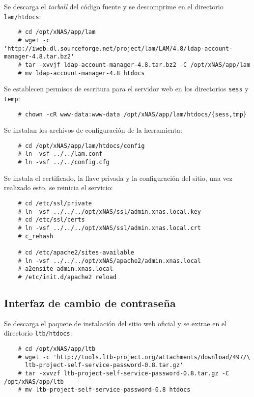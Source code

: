 Se descarga el \textit{tarball} del c\'{o}digo fuente y se descomprime en el directorio \texttt{lam/htdocs}:

{
\scriptsize
\linespread{1}
\begin{verbatim}
    # cd /opt/xNAS/app/lam
    # wget -c 'http://iweb.dl.sourceforge.net/project/lam/LAM/4.8/ldap-account-manager-4.8.tar.bz2'
    # tar -xvvjf ldap-account-manager-4.8.tar.bz2 -C /opt/xNAS/app/lam
    # mv ldap-account-manager-4.8 htdocs
\end{verbatim}
}

Se establecen permisos de escritura para el servidor web en los directorios \texttt{sess} y \texttt{temp}:

{
\scriptsize
\linespread{1}
\begin{verbatim}
    # chown -cR www-data:www-data /opt/xNAS/app/lam/htdocs/{sess,tmp}
\end{verbatim}
}

Se instalan los archivos de configuraci\'{o}n de la herramienta:

{
\scriptsize
\linespread{1}
\begin{verbatim}
    # cd /opt/xNAS/app/lam/htdocs/config
    # ln -vsf ../../lam.conf
    # ln -vsf ../../config.cfg
\end{verbatim}
}

Se instala el certificado, la llave privada y la configuraci\'{o}n del sitio, una vez realizado esto, se reinicia el servicio:

{
\scriptsize
\linespread{1}
\begin{verbatim}
    # cd /etc/ssl/private
    # ln -vsf ../../../opt/xNAS/ssl/admin.xnas.local.key
    # cd /etc/ssl/certs
    # ln -vsf ../../../opt/xNAS/ssl/admin.xnas.local.crt
    # c_rehash

    # cd /etc/apache2/sites-available
    # ln -vsf ../../../opt/xNAS/apache2/admin.xnas.local
    # a2ensite admin.xnas.local
    # /etc/init.d/apache2 reload
\end{verbatim}
}

      \subsection {Interfaz de cambio de contrase\~{n}a}

Se descarga el paquete de instalaci\'{o}n del sitio web oficial y se extrae en el directorio \texttt{ltb/htdocs}:

{
\scriptsize
\linespread{1}
\begin{verbatim}
    # cd /opt/xNAS/app/ltb
    # wget -c 'http://tools.ltb-project.org/attachments/download/497/\ 
      ltb-project-self-service-password-0.8.tar.gz'
    # tar -xvvzf ltb-project-self-service-password-0.8.tar.gz -C /opt/xNAS/app/ltb
    # mv ltb-project-self-service-password-0.8 htdocs
\end{verbatim}
}

